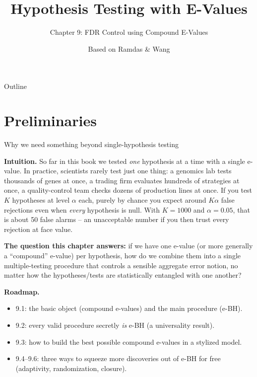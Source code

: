 \documentclass[aspectratio=169,10pt]{beamer}
\title[E-Values -- Ch.9]{Hypothesis Testing with E-Values}
\subtitle{Chapter 9: FDR Control using Compound E-Values}
\author{Based on Ramdas \& Wang}
\date{}
\begin{document}
\begin{frame}
\titlepage
\end{frame}

\begin{frame}{Outline}
\tableofcontents
\end{frame}

\section{Preliminaries}

\begin{frame}[allowframebreaks]{Why we need something beyond single-hypothesis testing}

\textbf{Intuition.} So far in this book we tested \emph{one} hypothesis at a time with a single e-value. In practice, scientists rarely test just one thing: a genomics lab tests thousands of genes at once, a trading firm evaluates hundreds of strategies at once, a quality-control team checks dozens of production lines at once. If you test $K$ hypotheses at level $\alpha$ each, purely by chance you expect around $K\alpha$ false rejections even when \emph{every} hypothesis is null. With $K=1000$ and $\alpha=0.05$, that is about 50 false alarms -- an unacceptable number if you then trust every rejection at face value.

\vspace{2mm}
\textbf{The question this chapter answers:} if we have one e-value (or more generally a ``compound'' e-value) per hypothesis, how do we combine them into a single multiple-testing procedure that controls a sensible aggregate error notion, no matter how the hypotheses/tests are statistically entangled with one another?

\vspace{2mm}
\textbf{Roadmap.}
\begin{itemize}
\item 9.1: the basic object (compound e-values) and the main procedure (e-BH).
\item 9.2: every valid procedure secretly \emph{is} e-BH (a universality result).
\item 9.3: how to build the best possible compound e-values in a stylized model.
\item 9.4--9.6: three ways to squeeze more discoveries out of e-BH for free (adaptivity, randomization, closure).
\end{itemize}


\end{frame}
\end{document}
